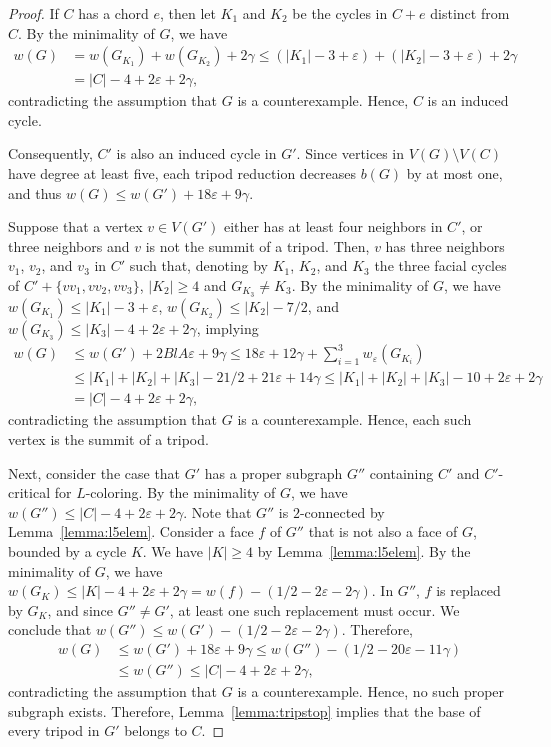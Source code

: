 \documentclass[12pt,twoside,openright,a4paper]{book}
\begin{document}
\begin{proof}
If $C$ has a chord $e$, then let $K_1$ and $K_2$ be the cycles in $C+e$ distinct from $C$.
By the minimality of $G$, we have
\begin{align*}
w(G)&=w(G_{K_1})+w(G_{K_2})+2\gamma\le (|K_1|-3+\varepsilon)+(|K_2|-3+\varepsilon)+2\gamma\\
&=|C|-4+2\varepsilon+2\gamma,
\end{align*}
contradicting the assumption that $G$ is a counterexample.   Hence, $C$ is an induced cycle.

Consequently, $C'$ is also an induced cycle in $G'$.  Since vertices in $V(G)\setminus V(C)$
have degree at least five, each tripod reduction decreases $b(G)$ by at most one, and thus
$w(G)\le w(G')+18\varepsilon+9\gamma$.

Suppose that a vertex $v\in V(G')$ either has at least four neighbors in $C'$, or three neighbors
and $v$ is not the summit of a tripod.  Then, $v$ has three neighbors $v_1$, $v_2$, and $v_3$
in $C'$ such that, denoting by $K_1$, $K_2$, and $K_3$ the three
facial cycles of $C'+\{vv_1,vv_2,vv_3\}$, $|K_2|\ge 4$ and $G_{K_3}\neq K_3$.
By the minimality of $G$, we have $w(G_{K_1})\le |K_1|-3+\varepsilon$,
$w(G_{K_2})\le |K_2|-7/2$, and $w(G_{K_3})\le |K_3|-4+2\varepsilon+2\gamma$,
implying
\begin{align*}
w(G)&\le w(G')+2BlA\varepsilon+9\gamma\le 18\varepsilon+12\gamma+\sum_{i=1}^3 w_\varepsilon(G_{K_i})\\
&\le |K_1|+|K_2|+|K_3|-21/2+21\varepsilon+14\gamma\le |K_1|+|K_2|+|K_3|-10+2\varepsilon+2\gamma\\
&=|C|-4+2\varepsilon+2\gamma,
\end{align*}
contradicting the assumption that $G$ is a counterexample.   Hence, each such vertex is the summit
of a tripod.

Next, consider the case that $G'$ has a proper subgraph $G''$ containing $C'$ and $C'$-critical for $L$-coloring.
By the minimality of $G$, we have $w(G'')\le |C|-4+2\varepsilon+2\gamma$.
Note that $G''$ is $2$-connected by Lemma~\ref{lemma:l5elem}.
Consider a face $f$ of $G''$ that is not also a face of $G$, bounded by a cycle $K$.  We have $|K|\ge 4$ by Lemma~\ref{lemma:l5elem}.
By the minimality of $G$, we have $w(G_K)\le |K|-4+2\varepsilon+2\gamma=w(f)-(1/2-2\varepsilon-2\gamma)$.
In $G''$, $f$ is replaced by $G_K$, and since $G''\neq G'$, at least one such replacement must occur.  We conclude that
$w(G'')\le w(G')-(1/2-2\varepsilon-2\gamma)$.  Therefore,
\begin{align*}
w(G)&\le w(G')+18\varepsilon+9\gamma\le w(G'')-(1/2-20\varepsilon-11\gamma)\\
&\le w(G'')\le |C|-4+2\varepsilon+2\gamma,
\end{align*}
contradicting the assumption that $G$ is a counterexample.   Hence, no such proper subgraph exists.
Therefore, Lemma~\ref{lemma:tripstop} implies that the base of every tripod in $G'$ belongs to $C$.


\end{proof}
\end{document}

